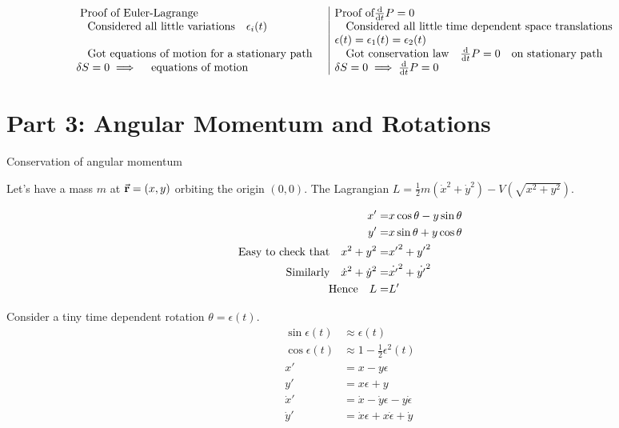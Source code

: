 \documentclass{article}
\begin{document}
\[
    \begin{array}{l|l}
        \mbox{ Proof of Euler-Lagrange}                    & \mbox{Proof of} \dv{t}P=0                                    \\
        \qq{Considered all little variations}\epsilon_i(t) & \qq{Considered all little time dependent space translations} \\
                                                           & \epsilon(t)=\epsilon_1(t)=\epsilon_2(t)                      \\
        \qq{Got equations of motion for a stationary path} & \qq{Got conservation law}\dv{t}P=0 \qq{on stationary path}   \\
        \var{S}=0\implies \qq{equations of motion}         & \var{S}=0\implies   \dv{t}P=0                                \\
    \end{array}
\]

\section*{Part 3: Angular Momentum and Rotations}

Conservation of angular momentum

Let's have a mass $m$ at $\va{r}=(x,y)$ orbiting the origin $(0,0)$. The Lagrangian $L=\frac{1}{2}m(\dot{x}^2+\dot{y}^2)-V(\sqrt{x^2+y^2})$.

\begin{align*}
    x'=                                 & x\cos\theta-y\sin\theta \\
    y'=                                 & x\sin\theta+y\cos\theta \\
    \qq*{Easy to check that}x^2+y^2=    & {x'}^2+{y'}^2           \\
    \qq*{Similarly}\dot{x}^2+\dot{y}^2= & \dot{x'}^2+\dot{y'}^2   \\
    \qq*{Hence}L=                       & L'
\end{align*}

Consider a tiny time dependent rotation $\theta=\epsilon(t)$.
\begin{align*}
    \sin\epsilon(t) & \approx \epsilon(t)                        \\
    \cos\epsilon(t) & \approx 1-\frac{1}{2}\epsilon^2 (t)        \\
    x'              & = x-y\epsilon                              \\
    y'              & = x\epsilon+y                              \\
    \dot{x}'        & = \dot{x}-\dot{y}\epsilon -y\dot{\epsilon} \\
    \dot{y}'        & = \dot{x}\epsilon+x\dot{\epsilon}+\dot{y}  \\
\end{align*}
\end{document}
